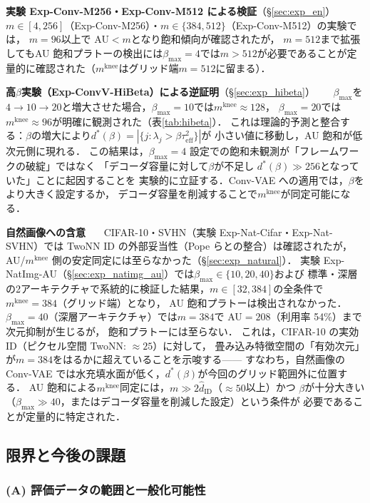 \documentclass[11pt,a4paper]{jsarticle}
\newcommand{\mknee}{m^{\mathrm{knee}}}
\begin{document}
\textbf{実験 Exp-Conv-M256・Exp-Conv-M512 による検証}（§\ref{sec:exp_en}）~~~
$m \in [4,256]$（Exp-Conv-M256）・$m \in \{384,512\}$（Exp-Conv-M512）の実験では，
$m = 96$以上で AU$<m$となり飽和傾向が確認されたが，
$m=512$まで拡張してもAU 飽和プラトーの検出には$\beta_{\max}=4$では$m>512$が必要であることが定量的に確認された（$\mknee$はグリッド端$m=512$に留まる）．

\textbf{高$\beta$実験（Exp-ConvV-HiBeta）による逆証明}（§\ref{sec:exp_hibeta}）~~~
$\beta_{\max}$を$4\to10\to20$と増大させた場合，$\beta_{\max}=10$では$\mknee \approx 128$，
$\beta_{\max}=20$では$\mknee \approx 96$が明確に観測された（表\ref{tab:hibeta}）．
これは理論的予測と整合する：$\beta$の増大により$d^*(\beta) = |\{j: \lambda_j > \beta\tau^2_\mathrm{eff}\}|$が
小さい値に移動し，AU 飽和が低次元側に現れる．
この結果は，$\beta_{\max}=4$ 設定での飽和未観測が「フレームワークの破綻」ではなく
「デコーダ容量に対して$\beta$が不足し $d^*(\beta) \gg 256$となっていた」ことに起因することを
実験的に立証する．Conv-VAE への適用では，$\beta$をより大きく設定するか，
デコーダ容量を削減することで$\mknee$が同定可能になる．


\textbf{自然画像への含意}~~~
CIFAR-10・SVHN（実験 Exp-Nat-Cifar・Exp-Nat-SVHN）では TwoNN ID の外部妥当性（Pope ら\cite{pope2021intrinsic}との整合）は確認されたが，
AU/$\mknee$ 側の安定同定には至らなかった（§\ref{sec:exp_natural}）．
実験 Exp-NatImg-AU（§\ref{sec:exp_natimg_au}）では$\beta_{\max} \in \{10,20,40\}$および
標準・深層の2アーキテクチャで系統的に検証した結果，$m \in [32, 384]$の全条件で$\mknee = 384$（グリッド端）となり，
AU 飽和プラトーは検出されなかった．
$\beta_{\max}=40$（深層アーキテクチャ）では$m=384$で AU$=208$（利用率 54\%）まで次元抑制が生じるが，
飽和プラトーには至らない．
これは，CIFAR-10 の実効 ID（ピクセル空間 TwoNN: $\approx25$）に対して，
畳み込み特徴空間の「有効次元」が$m=384$をはるかに超えていることを示唆する——
すなわち，自然画像の Conv-VAE では水充填水面が低く，$d^*(\beta)$が今回のグリッド範囲外に位置する．
AU 飽和による$\mknee$同定には，$m \gg 2\hat{d}_\mathrm{ID}$（$\approx 50$以上）かつ
$\beta$が十分大きい（$\beta_{\max} \gg 40$，またはデコーダ容量を削減した設定）という条件が
必要であることが定量的に特定された．

\subsection{限界と今後の課題}\label{sec:disc_limitation}

\subsubsection*{(A) 評価データの範囲と一般化可能性}
\end{document}
